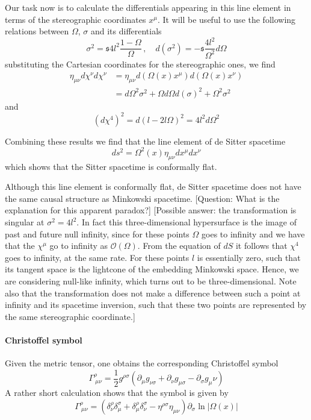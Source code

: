 \documentclass[10pt]{article}
\newcommand{\mcal}{\mathcal}
\newcommand{\pd}{\partial}
\newcommand{\sfr}{\mathfrak{s}}
\newcommand{\blankline}{\vspace{\baselineskip}}
\newcommand{\spc}{\ }
\begin{document}
Our task now is to calculate the differentials appearing in this 
line element in terms
of the stereographic coordinates $x^\mu$. It will be useful to 
use the following
relations between $\Omega$, $\sigma$ and its differentials
\begin{displaymath}
	\sigma^2 = \sfr 4l^2 \frac{1 - \Omega}{\Omega}\, ,\quad
	d(\sigma^2)= -\sfr\frac{4l^2}{\Omega^2}d\Omega
\end{displaymath}
substituting the Cartesian coordinates for the stereographic 
ones, we find
\begin{align} \eta_{\mu\nu}d\chi^\nu d\chi^\nu
	&=\eta_{\mu\nu}d(\Omega(x)x^\mu)d(\Omega(x)x^\nu) \\
	&=d\Omega^2 \sigma^2 + \Omega d\Omega d(\sigma)^2 + \Omega^2 
	\sigma^2
\end{align}
and
\begin{equation}
	(d\chi^4)^2 = d(l - 2l\Omega)^2 = 4l^2 d\Omega^2
\end{equation}

Combining these results we find that the line element of de 
Sitter spacetime
\begin{equation}
	ds^2 = \Omega^2(x)\eta_{\mu\nu}dx^\mu dx^\nu
	\label{eq:dS_le_stereo}
\end{equation}
which shows that the Sitter spacetime is conformally flat.
\blankline

Although this line element is conformally flat, de Sitter 
spacetime does not have the
same causal structure as Minkowski spacetime. [Question: What is 
the explanation for
this apparent paradox?] [Possible answer: the transformation is 
singular at $\sigma^2
= 4l^2$. In fact this three-dimensional hypersurface is the image 
of past and future
null infinity, since for these points $\Omega$ goes to infinity 
and we have that the $\chi^\mu$ go to infinity as 
$\mcal{O}(\Omega)$. From the equation of $dS$ it follows that 
$\chi^4$ goes to infinity, at the same rate. For these points $l$ 
is essentially zero, such that its tangent space is the lightcone 
of the embedding Minkowski space. Hence, we are considering 
null-like infinity, which turns out to be three-dimensional. Note 
also that the transformation does not make a difference between 
such a point at infinity and its spacetime inversion, such that 
these two points are represented by the same stereographic 
coordinate.]

\paragraph{Christoffel symbol}
Given the metric tensor, one obtains the corresponding 
Christoffel symbol
\begin{displaymath}
	\Gamma^{\rho}_{\spc\mu\nu} = \frac{1}{2}g^{\rho\sigma} \left( 
		\pd_\mu g_{\nu\sigma} + \pd_\nu g_{\mu\sigma} - \pd_\sigma 
		g_\mu\nu \right)
\end{displaymath}
A rather short calculation shows that the symbol is given by
\begin{equation}
	\Gamma^{\rho}_{\spc\mu\nu} = \left( \delta_\nu^\rho 
		\delta_\mu^\sigma + \delta_\mu^\rho \delta_\nu^\sigma - 
		\eta^{\rho\sigma} \eta_{\mu\nu} \right) \pd_\sigma \ln 
	|\Omega(x)|
\end{equation}
\end{document}
